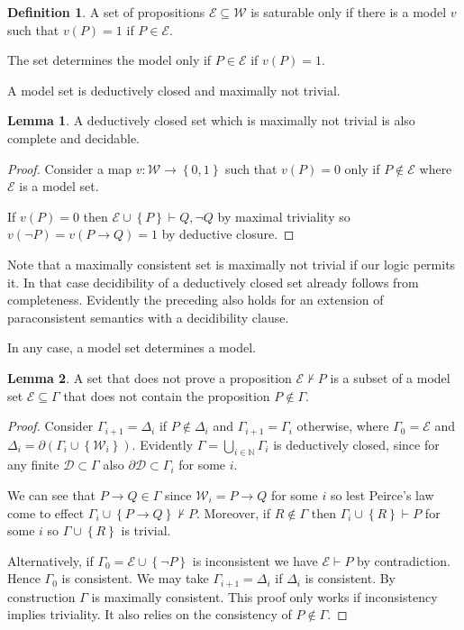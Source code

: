 \documentclass{amsbook}
\newcommand{\setsm}[1]{\left\{#1\right\}}
\newcommand{\wffs}{\mathcal W}
\newcommand{\infers}{\mathrel\vdash}
\newcommand{\then}{\mathrel\rightarrow}
\theoremstyle{definition}
\newtheorem{lmm}{Lemma}[section]
\newtheorem{dfn}{Definition}[section]
\begin{document}
\begin{dfn}
    A set of propositions $\mathcal E \subseteq \wffs$ is saturable only if there is a model $v$ such that $v(P) = 1$ if $P \in \mathcal E$.

    The set determines the model only if $P \in \mathcal E$ if $v(P) = 1$.

    A model set is deductively closed and maximally not trivial.
\end{dfn}

\begin{lmm}
    A deductively closed set which is maximally not trivial is also complete and decidable.
    \begin{proof}
        Consider a map $v: \wffs \longrightarrow \setsm{0,1}$ such that $v(P) = 0$ only if $P \notin \mathcal E$ where $\mathcal E$ is a model set.

        If $v(P) = 0$ then $\mathcal E \cup \setsm P \infers Q, \neg Q$ by maximal triviality so $v(\neg P) = v(P \then Q) = 1$ by deductive closure.
    \end{proof}
\end{lmm}


Note that a maximally consistent set is maximally not trivial if our logic permits it. In that case decidibility of a deductively closed set already follows from completeness. Evidently the preceding also holds for an extension of paraconsistent semantics with a decidibility clause.

In any case, a model set determines a model.

\begin{lmm}
    A set that does not prove a proposition $\mathcal E \nvdash P$ is a subset of a model set $\mathcal E \subseteq \Gamma$ that does not contain the proposition $P \notin \Gamma$.
    \begin{proof}
        Consider $\Gamma_{i+1} = \Delta_i$ if $P \notin \Delta_i$ and $\Gamma_{i+1} = \Gamma_i$ otherwise, where $\Gamma_0 = \mathcal E$ and $\Delta_i = \partial(\Gamma_i \cup \setsm {\wffs_i})$.
        Evidently $\Gamma = \bigcup_{i \in \mathbb N} \Gamma_i$ is deductively closed, since for any finite $\mathcal D \subset \Gamma$ also $\partial\mathcal D \subset \Gamma_i$ for some $i$.

        We can see that $P \then Q \in \Gamma$ since $\wffs_i = P \then Q$ for some $i$ so lest Peirce's law come to effect $\Gamma_i \cup \setsm{P \then Q} \nvdash P$. Moreover, if $R \notin \Gamma$ then $\Gamma_i \cup \setsm R \infers P$ for some $i$ so $\Gamma \cup \setsm R$ is trivial.

        Alternatively, if $\Gamma_0 = \mathcal E \cup \setsm {\neg P}$ is inconsistent we have $\mathcal E \infers P$ by contradiction. Hence $\Gamma_0$ is consistent. We may take $\Gamma_{i+1} = \Delta_i$ if $\Delta_i$ is consistent. By construction $\Gamma$ is maximally consistent. This proof only works if inconsistency implies triviality. It also relies on the consistency of $P \notin \Gamma$.
    \end{proof}
\end{lmm}
\end{document}
